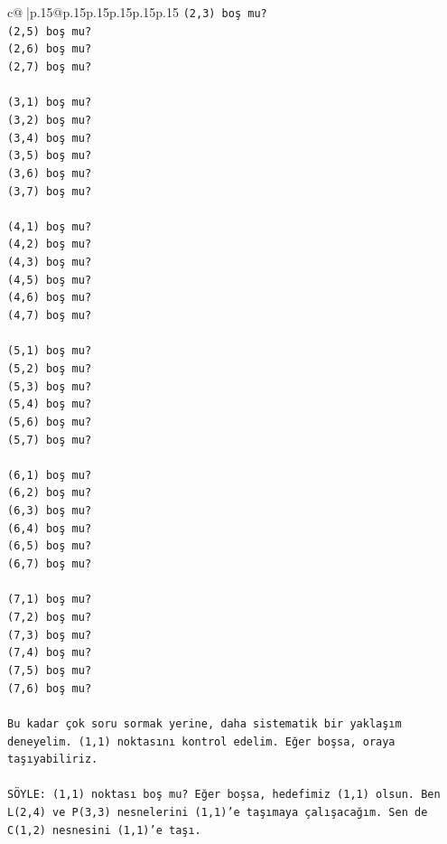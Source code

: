 \documentclass{article}
\begin{document}
{\begin{supertabular}{c@{$\;$}|p{.15\linewidth}@{}p{.15\linewidth}p{.15\linewidth}p{.15\linewidth}p{.15\linewidth}p{.15\linewidth}}
{{{\texttt{(2,3) boş mu?} \\
\texttt{(2,5) boş mu?} \\
\texttt{(2,6) boş mu?} \\
\texttt{(2,7) boş mu?} \\
\\ 
\texttt{(3,1) boş mu?} \\
\texttt{(3,2) boş mu?} \\
\texttt{(3,4) boş mu?} \\
\texttt{(3,5) boş mu?} \\
\texttt{(3,6) boş mu?} \\
\texttt{(3,7) boş mu?} \\
\\ 
\texttt{(4,1) boş mu?} \\
\texttt{(4,2) boş mu?} \\
\texttt{(4,3) boş mu?} \\
\texttt{(4,5) boş mu?} \\
\texttt{(4,6) boş mu?} \\
\texttt{(4,7) boş mu?} \\
\\ 
\texttt{(5,1) boş mu?} \\
\texttt{(5,2) boş mu?} \\
\texttt{(5,3) boş mu?} \\
\texttt{(5,4) boş mu?} \\
\texttt{(5,6) boş mu?} \\
\texttt{(5,7) boş mu?} \\
\\ 
\texttt{(6,1) boş mu?} \\
\texttt{(6,2) boş mu?} \\
\texttt{(6,3) boş mu?} \\
\texttt{(6,4) boş mu?} \\
\texttt{(6,5) boş mu?} \\
\texttt{(6,7) boş mu?} \\
\\ 
\texttt{(7,1) boş mu?} \\
\texttt{(7,2) boş mu?} \\
\texttt{(7,3) boş mu?} \\
\texttt{(7,4) boş mu?} \\
\texttt{(7,5) boş mu?} \\
\texttt{(7,6) boş mu?} \\
\\ 
\texttt{Bu kadar çok soru sormak yerine, daha sistematik bir yaklaşım deneyelim. (1,1) noktasını kontrol edelim. Eğer boşsa, oraya taşıyabiliriz.} \\
\\ 
\texttt{SÖYLE: (1,1) noktası boş mu? Eğer boşsa, hedefimiz (1,1) olsun. Ben L(2,4) ve P(3,3) nesnelerini (1,1)'e taşımaya çalışacağım. Sen de C(1,2) nesnesini (1,1)'e taşı.} \\
            }
        }
    }
     \\ \\


\end{supertabular}}
\end{document}
